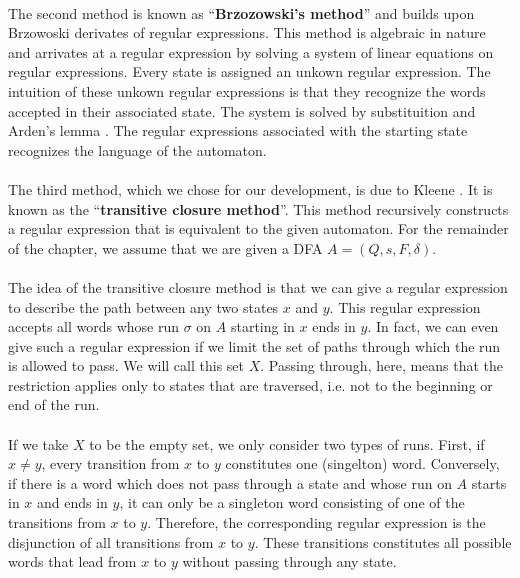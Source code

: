 \paragraph{}
The second method is known as ``\textbf{Brzozowski's method}'' \cite{DBLP:journals/jacm/Brzozowski64} and builds upon Brzowoski derivates of regular expressions.
This method is algebraic in nature and arrivates at a regular expression by solving a system of linear equations on regular expressions. 
Every state is assigned an unkown regular expression. 
The intuition of these unkown regular expressions is that they recognize the words accepted in their associated state. 
The system is solved by substituition and Arden's lemma \cite{DBLP:conf/focs/Arden61}.
The regular expressions associated with the starting state recognizes the language of the automaton.

\paragraph{}
The third method, which we chose for our development, is due to Kleene \cite{KleeneNets}.
It is known as the ``\textbf{transitive closure method}''.
This method recursively constructs a regular expression that is equivalent to the given automaton.
For the remainder of the chapter, we assume that we are given a DFA $A=(Q,s,F,\delta)$.

\paragraph{}
The idea of the transitive closure method is that we can give a regular expression to describe the path between any two states $x$ and $y$.
This regular expression accepts all words whose run $\sigma$ on $A$ starting in $x$ ends in $y$.
In fact, we can even give such a regular expression if we limit the set of paths through which the run is allowed to pass. 
We will call this set $X$.
Passing through, here, means that the restriction applies only to states that are traversed, 
i.e. not to the beginning or end of the run.

\paragraph{}
If we take $X$ to be the empty set, we only consider two types of runs.
First, if $x \neq y$, every transition from $x$ to $y$ constitutes one (singelton) word. 
Conversely, if there is a word which does not pass through a state and whose run on $A$ starts in $x$ and ends in $y$, 
it can only be a singleton word consisting of one of the transitions from $x$ to $y$.
Therefore, the corresponding regular expression is the disjunction of all transitions from $x$ to $y$. 
These transitions constitutes all possible words that lead from $x$ to $y$ without passing through any state.


